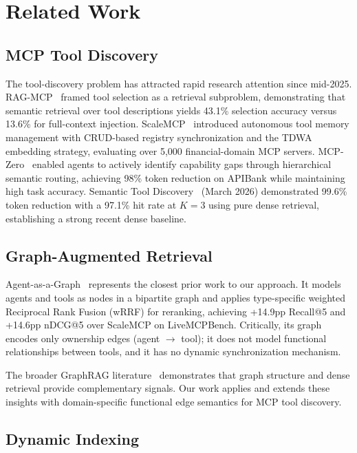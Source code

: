 \documentclass[conference]{IEEEtran}
\begin{document}
\section{Related Work}

\subsection{MCP Tool Discovery}

The tool-discovery problem has attracted rapid research attention
since mid-2025. RAG-MCP~\cite{gan2025ragmcp} framed tool selection as
a retrieval subproblem, demonstrating that semantic retrieval over
tool descriptions yields 43.1\% selection accuracy versus 13.6\% for
full-context injection. ScaleMCP~\cite{lumer2025scalemcp} introduced
autonomous tool memory management with CRUD-based registry
synchronization and the TDWA embedding strategy, evaluating over
5,000 financial-domain MCP servers. MCP-Zero~\cite{fei2025mcpzero}
enabled agents to actively identify capability gaps through
hierarchical semantic routing, achieving 98\% token reduction on
APIBank while maintaining high task accuracy. Semantic Tool
Discovery~\cite{semtool2026} (March 2026) demonstrated 99.6\% token
reduction with a 97.1\% hit rate at $K=3$ using pure dense retrieval,
establishing a strong recent dense baseline.

\subsection{Graph-Augmented Retrieval}

Agent-as-a-Graph~\cite{nizar2025agentgraph} represents the closest
prior work to our approach. It models agents and tools as nodes in a
bipartite graph and applies type-specific weighted Reciprocal Rank
Fusion (wRRF) for reranking, achieving +14.9pp Recall@5 and +14.6pp
nDCG@5 over ScaleMCP on LiveMCPBench. Critically, its graph encodes
only ownership edges (agent $\to$ tool); it does not model functional
relationships between tools, and it has no dynamic synchronization
mechanism.

The broader GraphRAG literature~\cite{edge2024graphrag} demonstrates
that graph structure and dense retrieval provide complementary
signals. Our work applies and extends these insights with
domain-specific functional edge semantics for MCP tool discovery.

\subsection{Dynamic Indexing}
\end{document}
